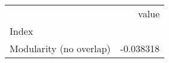 \begin{tabular}{lr}
\toprule
{} &     value \\
Index                   &           \\
\midrule
Modularity (no overlap) & -0.038318 \\
\bottomrule
\end{tabular}
